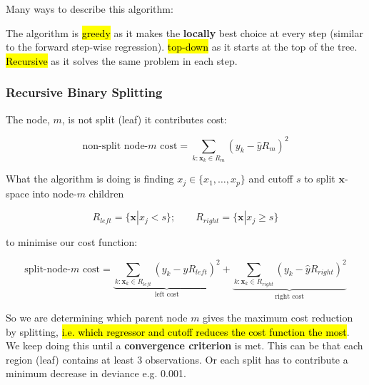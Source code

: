 \documentclass[11pt]{article}
\begin{document}
Many ways to describe this algorithm:

The algorithm is \hl{greedy} as it makes the \textbf{locally} best choice at every step (similar to the forward step-wise regression). \hl{top-down} as it starts at the top of the tree. \hl{Recursive} as it solves the same problem in each step.

\subsubsection{Recursive Binary Splitting}

The node, $m$, is not split (leaf) it contributes cost:

\begin{equation*}
    \text{non-split node-}m \text{ cost} = \sum_{k:\mathbf{x}_k\in R_m}(y_k - \hat{y}R_m)^2
\end{equation*}

What the algorithm is doing is finding $x_j \in \{x_1, \ldots, x_p\}$ and cutoff $s$ to split $\mathbf{x}$-space into node-$m$ children

\begin{equation*}
    R_{left} = \{\mathbf{x}|x_j<s\}; \qquad R_{right} = \{\mathbf{x}|x_j \geq s\}
\end{equation*}

to minimise our cost function:

\begin{equation*}
    \text{split-node-}m \text{ cost} = \underbrace{\sum_{k:\mathbf{x}_k\in R_{left}}(y_k - \hat{y}R_{left})^2}_{\text{left cost}} + \underbrace{\sum_{k:\mathbf{x}_k\in R_{right}}(y_k - \hat{y}R_{right})^2}_{\text{right cost}}
\end{equation*}

So we are determining which parent node $m$ gives the maximum cost reduction by splitting, \hl{i.e. which regressor and cutoff reduces the cost function the most}. We keep doing this until a \textbf{convergence criterion} is met. This can be that each region (leaf) contains at least 3 observations. Or each split has to contribute a minimum decrease in deviance e.g. 0.001.
\end{document}
